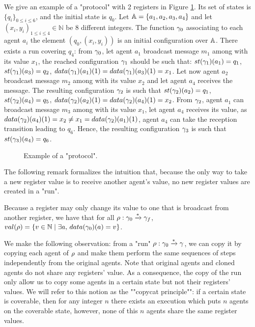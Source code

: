 \begin{example}\label{example-1}
	We give an example of a "protocol" with 2 registers in Figure \ref{fig:ex1}. Its set of states is $\{q_i\}_{0 \leq i \leq 6}$, and the initial state is $q_0$. Let $\mathbb{A} = \{a_1, a_2, a_3, a_4\}$ and let $(x_i, y_i)_{1 \leq i \leq 4} \in \mathbb{N}$ be 8 different integers. The function $\gamma_0$ associating to each agent $a_i$ the element $(q_0, (x_i, y_i))$ is an initial configuration over $\mathbb{A}$. There exists a run covering $q_4$: from $\gamma_0$, let agent $a_1$ broadcast message $m_1$ among with its value $x_1$, the reached configuration $\gamma_1$ should be such that: $\st{\config_1}(a_1)= q_1$, $\st{\config_1}(a_3)= q_2$, $\data{\config_1}(a_1)(1) = \data{\config_1}(a_3)(1) = x_1$. Let now agent $a_2$ broadcast message $m_2$ among with its value $x_2$ and let agent $a_4$ receives the message. The resulting configuration $\gamma_2$ is such that $\st{\config_2}(a_2)= q_1$, $\st{\config_2}(a_4)= q_5$, $\data{\config_2}(a_2)(1) = \data{\config_2}(a_4)(1) = x_2$. From $\gamma_2$, agent $a_1$ can broadcast message $m_3$ among with its value $x_1$, let agent $a_4$ receives its value, as $\data{\config_2}(a_4)(1) = x_2 \ne x_1 = \data{\config_2}(a_1)(1)$, agent $a_4$ can take the reception transition leading to $q_6$. Hence, the resulting configuration $\gamma_3$ is such that $\st{\config_3}(a_4)= q_6$. 
\end{example}

\begin{figure}
	
	\caption{Example of a "protocol".}\label{fig:ex1}
\end{figure}
	
	
The following remark formalizes the intuition that, because the only way to take a new register value is to receive another agent's value, no new register values are created in a "run".
\begin{remark}
	\label{rem:run_no_new_register_values}
	Because a register may only change its value to one that is broadcast from another register, we have that for all $\rho: \gamma_0 \xrightarrow{*} \gamma_f$, $\valsof{\run} = \set{\aval \in \nats \mid \exists a, \, \data{\config_0}(a) = \aval}$.
\end{remark}

\begin{remark}
	\label{rem:copycat-principle}
	We make the following observation: from a "run" $\rho : \gamma_0 \xrightarrow{\ast} \gamma$, we can copy it by copying each agent of $\rho$ and make them perform the same sequences of steps independently from the original agents. Note that original agents and cloned agents do not share any registers' value. As a consequence, the copy of the run only allow us to copy some agents in a certain state but not their registers' values. We will refer to this notion as the ""copycat principle"": if a certain state is coverable, then for any integer $n$ there exists an execution which puts $n$ agents on the coverable state, however, none of this $n$ agents share the same register values. 
\end{remark}

